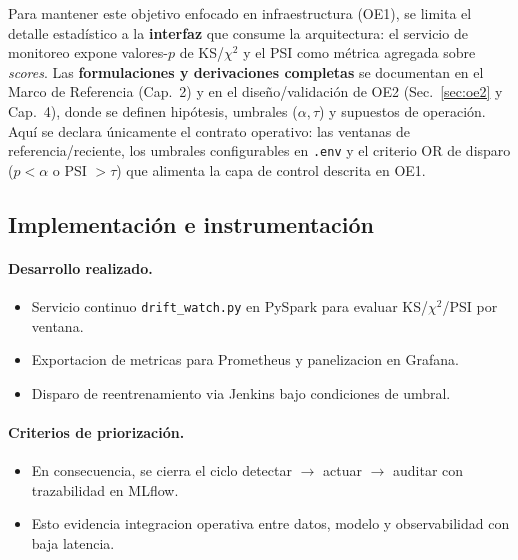 Para mantener este objetivo enfocado en infraestructura (OE1), se limita el detalle estadístico a la \textbf{interfaz} que consume la arquitectura: el servicio de monitoreo expone valores-$p$ de KS/$\chi^2$ y el PSI como métrica agregada sobre \textit{scores}. Las \textbf{formulaciones y derivaciones completas} se documentan en el Marco de Referencia (Cap.~2) y en el diseño/validación de OE2 (Sec.~\ref{sec:oe2} y Cap.~4), donde se definen hipótesis, umbrales (\(\alpha,\tau\)) y supuestos de operación. Aquí se declara únicamente el contrato operativo: las ventanas de referencia/reciente, los umbrales configurables en \texttt{.env} y el criterio OR de disparo ($p<\alpha$ o PSI $>\tau$) que alimenta la capa de control descrita en OE1.


\subsection{Implementación e instrumentación}

\paragraph{Desarrollo realizado.}
\begin{itemize}\setlength\itemsep{2pt}
  \item Servicio continuo \texttt{drift\_watch.py} en PySpark para evaluar KS/$\chi^2$/PSI por ventana.
  \item Exportacion de metricas para Prometheus y panelizacion en Grafana.
  \item Disparo de reentrenamiento via Jenkins bajo condiciones de umbral.
\end{itemize}

\paragraph{Criterios de priorización.}
\begin{itemize}\setlength\itemsep{2pt}
  \item En consecuencia, se cierra el ciclo detectar $\rightarrow$ actuar $\rightarrow$ auditar con trazabilidad en MLflow.
  \item Esto evidencia integracion operativa entre datos, modelo y observabilidad con baja latencia.
\end{itemize}

